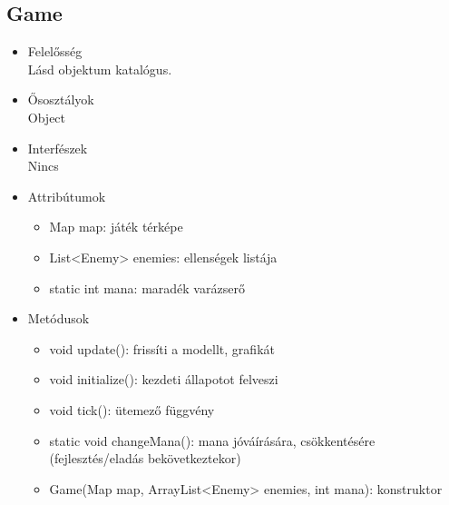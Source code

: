 \subsection{Game}
\begin{itemize}
\item Felelősség\\
Lásd objektum katalógus.
\item Ősosztályok\\
Object
\item Interfészek\\
Nincs
\item Attribútumok\\
	\begin{itemize}
		\item Map map: játék térképe
		\item List<Enemy> enemies: ellenségek listája
		\item static int mana: maradék varázserő


		
	\end{itemize}
\item Metódusok\\
	\begin{itemize}
		\item void update(): frissíti a modellt, grafikát
		\item void initialize(): kezdeti állapotot felveszi
		\item void tick(): ütemező függvény
		\item static void changeMana(): mana jóváírására, csökkentésére (fejlesztés/eladás bekövetkeztekor)
		\item Game(Map map, ArrayList<Enemy> enemies, int mana): konstruktor
		
		
	\end{itemize}
\end{itemize}
